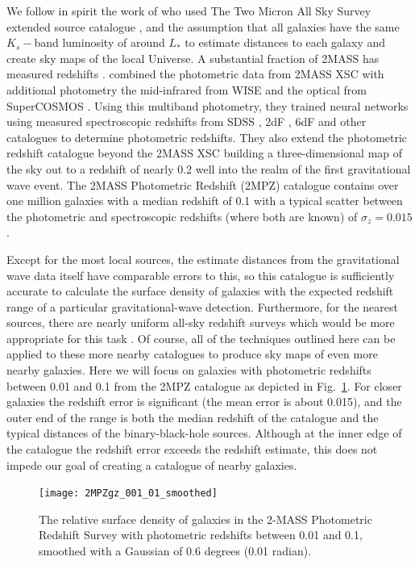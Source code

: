 \documentclass[useAMS,usenatbib]{mn2e}
\begin{document}
We follow in spirit the work of \citet{2004PASA...21..396J} who used
The Two Micron All Sky Survey extended source catalogue \citep[2MASS
  XSC,][]{2000AJ....119.2498J,2006AJ....131.1163S}, and the assumption
that all galaxies have the same $K_s-$band luminosity of around $L_*$
to estimate distances to each galaxy and create sky maps of the local
Universe.  A substantial fraction of 2MASS has measured redshifts
\citep[e.g][]{2012ApJS..199...26H}.  \citet{2014ApJS..210....9B}
combined the photometric data from 2MASS XSC with additional
photometry the mid-infrared from WISE \citep{2010AJ....140.1868W} and
the optical from SuperCOSMOS
\citep{2001MNRAS.326.1315H,2001MNRAS.326.1295H,2001MNRAS.326.1279H}.
Using this multiband photometry, they trained neural networks using
measured spectroscopic redshifts from SDSS
\citep{2012ApJS..203...21A,2014ApJS..211...17A}, 2dF
\citep{2001MNRAS.328.1039C,2003astro.ph..6581C}, 6dF
\citep{2004MNRAS.355..747J,2009MNRAS.399..683J} and other catalogues
to determine photometric redshifts.  They also extend the photometric
redshift catalogue beyond the 2MASS XSC building a three-dimensional
map of the sky out to a redshift of nearly 0.2 well into the realm of
the first gravitational wave event.  The 2MASS Photometric Redshift
(2MPZ) catalogue contains over one million galaxies with a median
redshift of 0.1 with a typical scatter between the
photometric and spectroscopic redshifts (where both are known) of
$\sigma_z = 0.015$.

Except for the most local sources, the estimate distances from the
gravitational wave data itself have comparable errors to this, so this
catalogue is sufficiently accurate to calculate the surface density of
galaxies with the expected redshift range of a particular
gravitational-wave detection.  Furthermore, for the nearest sources,
there are nearly uniform all-sky redshift surveys which would be more
appropriate for this task
\citep[e.g.][]{2000MNRAS.317...55S,2012ApJS..199...26H}.  Of course,
all of the techniques outlined here can be applied to these more
nearby catalogues to produce sky maps of even more nearby galaxies.
Here we will focus on galaxies with photometric redshifts between 0.01
and 0.1 from the 2MPZ catalogue as depicted in Fig.~\ref{fig:galmap}.
For closer galaxies the redshift error is significant (the mean error
is about 0.015), and the outer end of the range is both the median
redshift of the catalogue and the typical distances of the
binary-black-hole sources.  Although at the inner edge of the
catalogue the redshift error exceeds the redshift estimate, this
does not impede our goal of creating a catalogue of nearby galaxies.
\begin{figure}
  \texttt{[image: 2MPZgz\_001\_01\_smoothed]}
  \caption{The relative surface density of galaxies in the 2-MASS Photometric Redshift Survey with photometric redshifts between 0.01 and 0.1, smoothed with a Gaussian of 0.6 degrees (0.01 radian).}
  \label{fig:galmap}
\end{figure}
\end{document}
